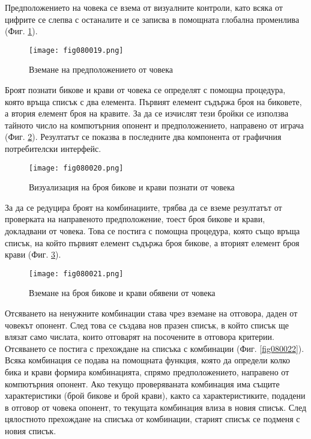 Предположението на човека се взема от визуалните контроли, като всяка от цифрите се слепва с останалите и се записва в помощната глобална променлива (Фиг. \ref{fig080019}).

\begin{figure}[H]
  \centering
  \texttt{[image: fig080019.png]}
  \caption{Вземане на предположението от човека}
\label{fig080019}
\end{figure}

Броят познати бикове и крави от човека се определят с помощна процедура, която връща списък с два елемента. Първият елемент съдържа броя на биковете, а втория елемент броя на кравите. За да се изчислят тези бройки се използва тайното число на компютърния опонент и предположението, направено от играча (Фиг. \ref{fig080020}). Резултатът се показва в последните два компонента от графичния потребителски интерфейс.

\begin{figure}[H]
  \centering
  \texttt{[image: fig080020.png]}
  \caption{Визуализация на броя бикове и крави познати от човека}
\label{fig080020}
\end{figure}

За да се редуцира броят на комбинациите, трябва да се вземе резултатът от проверката на направеното предположение, тоест броя бикове и крави, докладвани от човека. Това се постига с помощна процедура, която също връща списък, на който първият елемент съдържа броя бикове, а вторият елемент броя крави (Фиг. \ref{fig080021}).

\begin{figure}[H]
  \centering
  \texttt{[image: fig080021.png]}
  \caption{Вземане на броя бикове и крави обявени от човека}
\label{fig080021}
\end{figure}

Отсяването на ненужните комбинации става чрез вземане на отговора, даден от човекът опонент. След това се създава нов празен списък, в който списък ще влязат само числата, които отговарят на посочените в отговора критерии. Отсяването се постига с прехождане на списъка с комбинации (Фиг. \ref{fig080022}). Всяка комбинация се подава на помощната функция, която да определи колко бика и крави формира комбинацията, спрямо предположението, направено от компютърния опонент. Ако текущо проверяваната комбинация има същите характеристики (брой бикове и брой крави), както са характеристиките, подадени в отговор от човека опонент, то текущата комбинация влиза в новия списък. След цялостното прехождане на списъка от комбинации, старият списък се подменя с новия списък.

